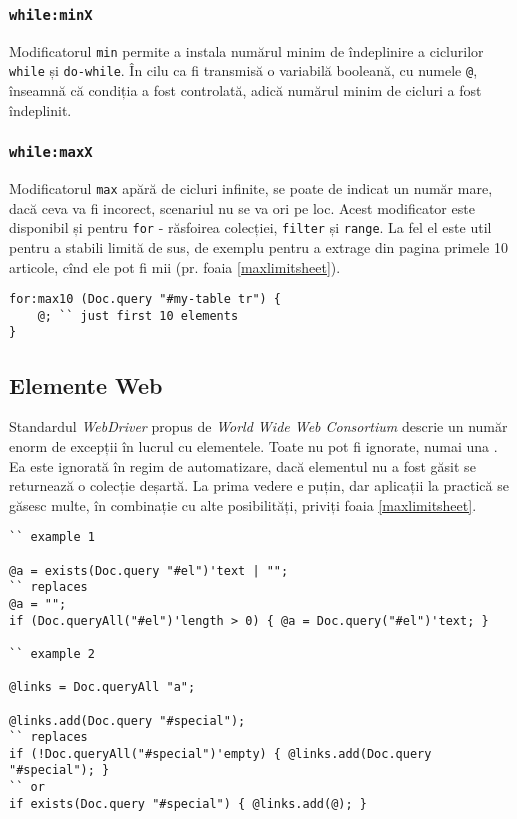\subsubsection{\texttt{while:minX}}

Modificatorul \texttt{min} permite a instala numărul minim de îndeplinire a ciclurilor \texttt{while} și \texttt{do-while}. În cilu ca fi transmisă o variabilă booleană, cu numele \texttt{@}, \true{} înseamnă că condiția a fost controlată, adică numărul minim de cicluri a fost îndeplinit.

\subsubsection{\texttt{while:maxX}}

Modificatorul \texttt{max} apără de cicluri infinite, se poate de indicat un număr mare, dacă ceva va fi incorect, scenariul nu se va ori pe loc. Acest modificator este disponibil și pentru \texttt{for} - răsfoirea colecției, \texttt{filter} și \texttt{range}. La fel el este util pentru a stabili limită de sus, de exemplu pentru a extrage din pagina primele 10 articole, cînd ele pot fi mii (pr. foaia \ref{maxlimitsheet}).

\begin{sourcecode}
\label{maxlimitsheet}
\begin{verbatim}
for:max10 (Doc.query "#my-table tr") {
	@; `` just first 10 elements
}
\end{verbatim}
\end{sourcecode}

\subsection{Elemente Web}

Standardul \textit{WebDriver} propus de \textit{World Wide Web Consortium} descrie un număr enorm de excepții în lucrul cu elementele. Toate nu pot fi ignorate, numai una . Ea este ignorată în regim de automatizare, dacă elementul nu a fost găsit se returnează o colecție deșartă. La prima vedere e puțin, dar aplicații la practică se găsesc multe, în combinație cu alte posibilități, priviți foaia \ref{maxlimitsheet}.

\begin{sourcecode}
\label{maxlimitsheet}
\begin{verbatim}
`` example 1

@a = exists(Doc.query "#el")'text | "";
`` replaces
@a = "";
if (Doc.queryAll("#el")'length > 0) { @a = Doc.query("#el")'text; }

`` example 2

@links = Doc.queryAll "a";

@links.add(Doc.query "#special");
`` replaces
if (!Doc.queryAll("#special")'empty) { @links.add(Doc.query "#special"); }
`` or
if exists(Doc.query "#special") { @links.add(@); }
\end{verbatim}
\end{sourcecode}


